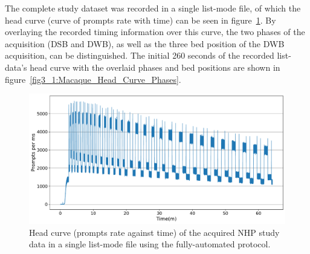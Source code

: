 The complete study dataset was recorded in a single list-mode file, of which the head curve (curve of prompts rate with time) can be seen in figure~\ref{fig3_1:Macaque_Head_Curve}. By overlaying the recorded timing information over this curve, the two phases of the acquisition (DSB and DWB), as well as the three bed position of the DWB acquisition, can be distinguished. The initial 260 seconds of the recorded list-data's head curve with the overlaid phases and bed positions are shown in figure~\ref{fig3_1:Macaque_Head_Curve_Phases}. 

\begin{figure} [ht!]
\centering
\includegraphics[scale=0.45,angle=0]{3_Results/3_1_DWB_Optimization/figures/3_1_Macaque_Head_Curve.pdf}
\caption{Head curve (prompts rate against time) of the acquired NHP study data in a single list-mode file using the fully-automated protocol.}
\label{fig3_1:Macaque_Head_Curve}
\end{figure}

